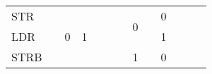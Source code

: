 \documentclass[a4paper,10pt]{report}
\begin{document}
\begin{table}[htb]
\begin{adjustbox}{center}
{\begin{tabular}{l|c|ccc|c|c|c|c|c|c|c|ccccc|cc|c|c|}
		\hhline{-~---~~-~-~~---------|}
		STR                                                          &                        & \multirow{4}{*}{0}                   & \multicolumn{1}{c|}{\multirow{4}{*}{1}}                   & {\cellcolor[rgb]{0.502,0.502,0.502}}                    &                                        &                     & \multirow{2}{*}{0}                                      &                                        & 0                                    &                      &                      & \multicolumn{9}{c|}{{\cellcolor[rgb]{0.502,0.502,0.502}}}                                                                                                                                                                                                                                                                                                     \\ 
		\hhline{-~~~>{\arrayrulecolor[rgb]{0.502,0.502,0.502}}-~~~~>{\arrayrulecolor{black}}-~~>{\arrayrulecolor[rgb]{0.502,0.502,0.502}}--------->{\arrayrulecolor{black}}|}
		LDR                                                          &                        &                                      & \multicolumn{1}{c|}{}                                     & {\cellcolor[rgb]{0.502,0.502,0.502}}                    &                                        &                     &                                                         &                                        & 1                                    &                      &                      & \multicolumn{9}{c|}{{\cellcolor[rgb]{0.502,0.502,0.502}}}                                                                                                                                                                                                                                                                                                     \\ 
		\hhline{-~~~>{\arrayrulecolor[rgb]{0.502,0.502,0.502}}-~~>{\arrayrulecolor{black}}-~-~~>{\arrayrulecolor[rgb]{0.502,0.502,0.502}}--------->{\arrayrulecolor{black}}|}
		STRB                                                         &                        &                                      & \multicolumn{1}{c|}{}                                     & {\cellcolor[rgb]{0.502,0.502,0.502}}                    &                                        &                     & \multirow{2}{*}{1}                                      &                                        & 0                                    &                      &                      & \multicolumn{9}{c|}{{\cellcolor[rgb]{0.502,0.502,0.502}}}                                                                                                                                                                                                                                                                                                     \\ 

\end{tabular}}
\end{adjustbox}
\end{table}
\end{document}
